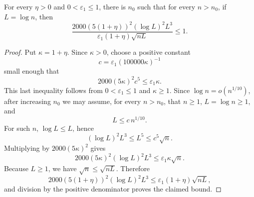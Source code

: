 \begin{helper}
For every \(\eta>0\) and \(0<\varepsilon_1\le1\), there is \(n_0\) such that
for every \(n>n_0\), if \(L=\log n\), then
\[
\frac{2000(5(1+\eta))^2(\log L)^2L^3}
{\varepsilon_1(1+\eta)\sqrt{nL}}\le1.
\]
\end{helper}
\begin{proof}
Put \(\kappa=1+\eta\).  Since \(\kappa>0\), choose a positive constant
\[
c=\varepsilon_1(100000\kappa)^{-1}
\]
small enough that
\[
2000(5\kappa)^2c^5\le\varepsilon_1\kappa.
\]
This last inequality follows from \(0<\varepsilon_1\le1\) and
\(\kappa\ge1\).  Since \(\log n=o(n^{1/10})\), after increasing \(n_0\) we
may assume, for every \(n>n_0\), that \(n\ge1\), \(L=\log n\ge1\), and
\[
L\le c\,n^{1/10}.
\]
For such \(n\), \(\log L\le L\), hence
\[
(\log L)^2L^3\le L^5\le c^5\sqrt n.
\]
Multiplying by \(2000(5\kappa)^2\) gives
\[
2000(5\kappa)^2(\log L)^2L^3
\le \varepsilon_1\kappa\sqrt n.
\]
Because \(L\ge1\), we have \(\sqrt n\le\sqrt{nL}\).  Therefore
\[
2000(5(1+\eta))^2(\log L)^2L^3
\le \varepsilon_1(1+\eta)\sqrt{nL},
\]
and division by the positive denominator proves the claimed bound.
\end{proof}
